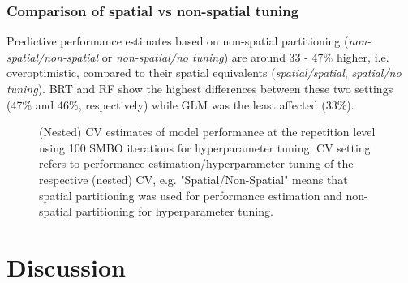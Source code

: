 \documentclass[review]{elsarticle}
\begin{document}
\subsubsection{Comparison of spatial vs non-spatial tuning}
Predictive performance estimates based on non-spatial partitioning (\emph{non-spatial/non-spatial} or \emph{non-spatial/no tuning}) are around 33 - 47\% higher, i.e. overoptimistic, compared to their spatial equivalents (\emph{spatial/spatial}, \emph{spatial/no tuning}).
BRT and RF show the highest differences between these two settings (47\% and 46\%, respectively) while GLM was the least affected (33\%).

\begin{figure} [t!]
	\begin{center}
		\caption[]{(Nested) \ac{CV} estimates of model performance at the repetition level using 100 SMBO iterations for hyperparameter tuning.
			CV setting refers to performance estimation/hyperparameter tuning of the respective (nested) CV, e.g. "Spatial/Non-Spatial" means that spatial partitioning was used for performance estimation and non-spatial partitioning for hyperparameter tuning.}
		\label{fig:cv_final_boxplots}
	\end{center}
\end{figure}

\section{Discussion}
\label{sec:discussion}
\end{document}
